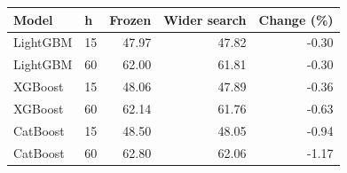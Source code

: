 \begin{tabular}{llrrr}
\toprule
Model & h & Frozen & Wider search & Change (\%) \\
\midrule
LightGBM & 15 & 47.97 & 47.82 & -0.30 \\
LightGBM & 60 & 62.00 & 61.81 & -0.30 \\
XGBoost & 15 & 48.06 & 47.89 & -0.36 \\
XGBoost & 60 & 62.14 & 61.76 & -0.63 \\
CatBoost & 15 & 48.50 & 48.05 & -0.94 \\
CatBoost & 60 & 62.80 & 62.06 & -1.17 \\
\bottomrule
\end{tabular}
